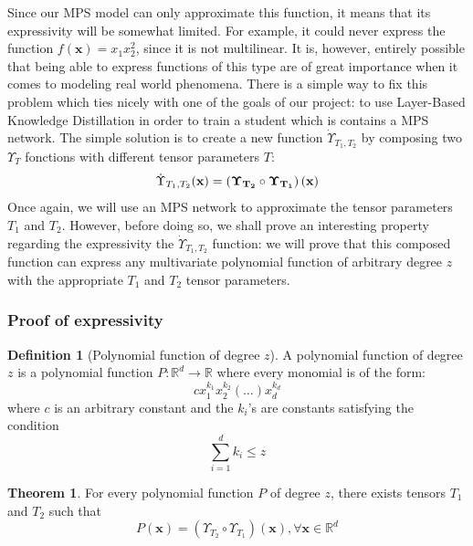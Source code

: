 \documentclass{article}
\theoremstyle{definition}
\newtheorem{definition}{Definition}[section]
\newtheorem{theorem}{Theorem}[section]
\theoremstyle{definition}
\begin{document}
Since our MPS model can only approximate this function, it means that its expressivity
will be somewhat limited. For example, it could never express the function $f(\mathbf{x}) = x_1x_2^2$, since it is not multilinear. It is, however, entirely possible that being able to express functions of this type are of great importance when it comes to modeling real world phenomena. There is a simple way to fix this problem which ties nicely with one of the  goals of our project: to use Layer-Based Knowledge Distillation in order to train a student which is contains a MPS network. The simple solution is to create a new function $\dot{\Upsilon}_{T_1, T_2}$ by composing two $\Upsilon_T$ fonctions with different tensor parameters $T$:
\[
    \dot{\Upsilon}_{T_1, T_2}(\bf{x})
    =
    \left(\Upsilon_{T_2} \circ \Upsilon_{T_1}\right) (\mathbf{x})
\]
Once again, we will use an MPS network to approximate the tensor parameters $T_1$ and $T_2$. However, before doing so, we shall prove an interesting property regarding the expressivity the $\dot{\Upsilon}_{T_1, T_2}$ function: we will prove that this composed function can express any multivariate polynomial function of arbitrary degree $z$ with the appropriate $T_1$ and $T_2$ tensor parameters.

\subsubsection{Proof of expressivity}
\begin{definition}[Polynomial function of degree $z$]

    A polynomial function of degree $z$ is a polynomial function $P: \mathbb{R}^d \to \mathbb{R}$ where every monomial is of the form:
    \[
        cx_1^{k_1} x_2^{k_2}(\dots)x_d^{k_d}
    \]
    where $c$ is an arbitrary constant and the $k_i$'s are constants satisfying the condition
    \[
        \sum_{i=1}^{d}k_i \leq z
    \]
\end{definition}


\begin{theorem}
    For every polynomial function $P$ of degree $z$, there exists tensors $T_1$ and $T_2$ such that
    \[ P(\mathbf{x}) = \left(\Upsilon_{T_2} \circ \Upsilon_{T_1}\right) (\mathbf{x}), \forall \mathbf{x} \in \mathbb{R}^d\]
\end{theorem}
\end{document}
